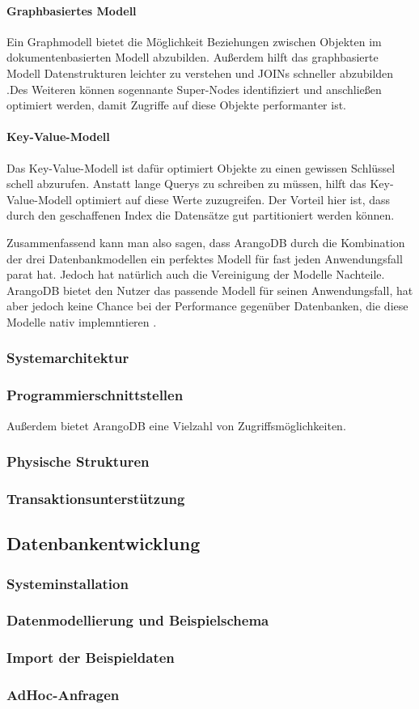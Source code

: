 \paragraph{Graphbasiertes Modell} Ein Graphmodell bietet die Möglichkeit Beziehungen zwischen Objekten im dokumentenbasierten Modell abzubilden. Außerdem hilft das graphbasierte Modell Datenstrukturen leichter zu verstehen und JOINs schneller abzubilden \cite{AWS_graph}.Des Weiteren können sogennante Super-Nodes identifiziert und anschließen optimiert werden, damit Zugriffe auf diese Objekte performanter ist.
\paragraph{Key-Value-Modell} Das Key-Value-Modell ist dafür optimiert Objekte zu einen gewissen Schlüssel schell abzurufen. Anstatt lange Querys zu schreiben zu müssen, hilft das Key-Value-Modell optimiert auf diese Werte zuzugreifen. Der Vorteil hier ist, dass durch den geschaffenen Index die Datensätze gut partitioniert werden können. \cite{AWS_keyvalue}

Zusammenfassend kann man also sagen, dass ArangoDB durch die Kombination der drei Datenbankmodellen ein perfektes Modell für fast jeden Anwendungsfall parat hat. Jedoch hat natürlich auch die Vereinigung der Modelle Nachteile. ArangoDB bietet den Nutzer das passende Modell für seinen Anwendungsfall, hat aber jedoch keine Chance bei der Performance gegenüber Datenbanken, die diese Modelle nativ implemntieren \cite{ADB_benchmark}.
\subsubsection{Systemarchitektur}
\subsubsection{Programmierschnittstellen}
Außerdem bietet ArangoDB eine Vielzahl von Zugriffsmöglichkeiten.
\subsubsection{Physische Strukturen}
\subsubsection{Transaktionsunterstützung}

\subsection{Datenbankentwicklung}
\subsubsection{Systeminstallation}
\subsubsection{Datenmodellierung und Beispielschema}
\subsubsection{Import der Beispieldaten}
\subsubsection{AdHoc-Anfragen}